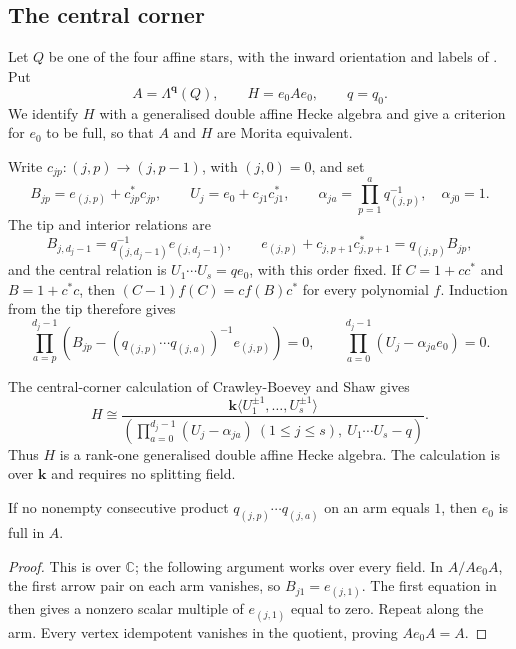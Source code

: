 \documentclass[a4paper]{amsart}
\newcommand{\kk}{\mathbf{k}}
\newcommand{\C}{\mathbb{C}}
\numberwithin{equation}{section}
\begin{document}
\subsection{The central corner}
\label{subsec:central-corner}

Let $Q$ be one of the four affine stars, with the inward orientation
and labels of . Put
\[
 A=\Lambda^{\boldsymbol q}(Q),\qquad H=e_0Ae_0,\qquad q=q_0.
\]
We identify $H$ with a generalised double affine Hecke algebra and
give a criterion for $e_0$ to be full, so that $A$ and $H$ are
Morita equivalent.

Write $c_{jp}:(j,p)\to(j,p-1)$, with $(j,0)=0$, and set
\[
 B_{jp}=e_{(j,p)}+c_{jp}^*c_{jp},\qquad
 U_j=e_0+c_{j1}c_{j1}^*,\qquad
 \alpha_{ja}=\prod_{p=1}^a q_{(j,p)}^{-1},\quad \alpha_{j0}=1.
\]
The tip and interior relations are
\[
 B_{j,d_j-1}=q_{(j,d_j-1)}^{-1}e_{(j,d_j-1)},\qquad
 e_{(j,p)}+c_{j,p+1}c_{j,p+1}^*=q_{(j,p)}B_{jp},
\]
and the central relation is $U_1\cdots U_s=qe_0$, with this order
fixed. If $C=1+cc^*$ and $B=1+c^*c$, then
$(C-1)f(C)=cf(B)c^*$ for every polynomial $f$. Induction from
the tip therefore gives
\begin{equation}\label{eq:star-leg-polynomial}
 \prod_{a=p}^{d_j-1}
 \left(B_{jp}-(q_{(j,p)}\cdots q_{(j,a)})^{-1}e_{(j,p)}\right)=0,
 \qquad
 \prod_{a=0}^{d_j-1}(U_j-\alpha_{ja}e_0)=0.
\end{equation}

The central-corner calculation of Crawley-Boevey and Shaw
\cite[Appendix~1, Lemma~10.1]{EOR} gives
\begin{equation}\label{eq:star-central-corner}
 H\cong
 \frac{\kk\langle U_1^{\pm1},\ldots,U_s^{\pm1}\rangle}
 {\left(\prod_{a=0}^{d_j-1}(U_j-\alpha_{ja})\ (1\le j\le s),
           \ U_1\cdots U_s-q\right)}.
\end{equation}
Thus $H$ is a rank-one generalised double affine Hecke algebra.
The calculation is over $\kk$ and requires no splitting field.

\begin{lemma}\label{lem:star-fullness}
If no nonempty consecutive product $q_{(j,p)}\cdots q_{(j,a)}$ on an
arm equals $1$, then $e_0$ is full in $A$.
\end{lemma}

\begin{proof}
This is \cite[Appendix~2, Proposition~11.2]{EOR} over $\C$; the
following argument works over every field.
In $A/Ae_0A$, the first arrow pair on each arm vanishes, so
$B_{j1}=e_{(j,1)}$. The first equation in
 then gives a nonzero scalar multiple
of $e_{(j,1)}$ equal to zero. Repeat along the arm. Every vertex
idempotent vanishes in the quotient, proving $Ae_0A=A$.
\end{proof}
\end{document}
